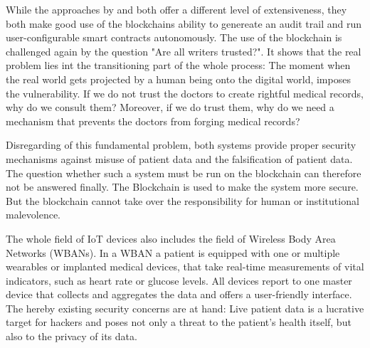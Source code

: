 While the approaches by \cite{Cao2019} and \cite{Azaria2016} both offer a different level of extensiveness, they both make good use of the blockchains ability to genereate an audit trail and run user-configurable smart contracts autonomously. 
The use of the blockchain is challenged again by the question "Are all writers trusted?"\cite{Wust2017}. It shows that the real problem lies int the transitioning part of the whole process: The moment when the real world gets projected by a human being onto the digital world, imposes the vulnerability.
If we do not trust the doctors to create rightful medical records, why do we consult them? Moreover, if we do trust them, why do we need a mechanism that prevents the doctors from forging medical records?

Disregarding of this fundamental problem, both systems provide proper security mechanisms against misuse of patient data and the falsification of patient data. The question whether such a system must be run on the blockchain can therefore not be answered finally. The Blockchain is used to make the system more secure. But the blockchain cannot take over the responsibility for human or institutional malevolence.

The whole field of IoT devices also includes the field of Wireless Body Area Networks (WBANs). In a WBAN a patient is equipped with one or multiple wearables or implanted medical devices, that take real-time measurements of vital indicators, such as heart rate or glucose levels. All devices report to one master device that collects and aggregates the data and offers a user-friendly interface.
The hereby existing security concerns are at hand: Live patient data is a lucrative target for hackers and poses not only a threat to the patient's health itself, but also to the privacy of its data.

